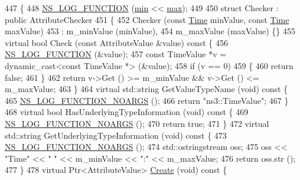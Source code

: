 \begin{DoxyCode}
447 \{
448   \hyperlink{log-macros-disabled_8h_a90b90d5bad1f39cb1b64923ea94c0761}{NS\_LOG\_FUNCTION} (\hyperlink{80211b_8c_ac6afabdc09a49a433ee19d8a9486056d}{min} << \hyperlink{80211b_8c_affe776513b24d84b39af8ab0930fef7f}{max});
449 
450   \textcolor{keyword}{struct }Checker : \textcolor{keyword}{public} AttributeChecker
451   \{
452     Checker (\textcolor{keyword}{const} \hyperlink{namespacens3_1_1TracedValueCallback_a7ffd3e7c142ffe7c8a1d2db9b8de38ec}{Time} minValue, \textcolor{keyword}{const} \hyperlink{namespacens3_1_1TracedValueCallback_a7ffd3e7c142ffe7c8a1d2db9b8de38ec}{Time} maxValue)
453       : m\_minValue (minValue),
454         m\_maxValue (maxValue) \{\}
455     \textcolor{keyword}{virtual} \textcolor{keywordtype}{bool} Check (\textcolor{keyword}{const} AttributeValue &value)\textcolor{keyword}{ const }\{
456       \hyperlink{log-macros-disabled_8h_a90b90d5bad1f39cb1b64923ea94c0761}{NS\_LOG\_FUNCTION} (&value);
457       \textcolor{keyword}{const} TimeValue *v = \textcolor{keyword}{dynamic\_cast<}\textcolor{keyword}{const }TimeValue *\textcolor{keyword}{>} (&value);
458       \textcolor{keywordflow}{if} (v == 0)
459         \{
460           \textcolor{keywordflow}{return} \textcolor{keyword}{false};
461         \}
462       \textcolor{keywordflow}{return} v->Get () >= m\_minValue && v->Get () <= m\_maxValue;
463     \}
464     \textcolor{keyword}{virtual} std::string GetValueTypeName (\textcolor{keywordtype}{void})\textcolor{keyword}{ const }\{
465       \hyperlink{log-macros-disabled_8h_a8f7e4afc291c9d29a65c18ac1f79197b}{NS\_LOG\_FUNCTION\_NOARGS} ();
466       \textcolor{keywordflow}{return} \textcolor{stringliteral}{"ns3::TimeValue"};
467     \}
468     \textcolor{keyword}{virtual} \textcolor{keywordtype}{bool} HasUnderlyingTypeInformation (\textcolor{keywordtype}{void})\textcolor{keyword}{ const }\{
469       \hyperlink{log-macros-disabled_8h_a8f7e4afc291c9d29a65c18ac1f79197b}{NS\_LOG\_FUNCTION\_NOARGS} ();
470       \textcolor{keywordflow}{return} \textcolor{keyword}{true};
471     \}
472     \textcolor{keyword}{virtual} std::string GetUnderlyingTypeInformation (\textcolor{keywordtype}{void})\textcolor{keyword}{ const }\{
473       \hyperlink{log-macros-disabled_8h_a8f7e4afc291c9d29a65c18ac1f79197b}{NS\_LOG\_FUNCTION\_NOARGS} ();
474       std::ostringstream oss;
475       oss << \textcolor{stringliteral}{"Time"} << \textcolor{stringliteral}{" "} << m\_minValue << \textcolor{stringliteral}{":"} << m\_maxValue;
476       \textcolor{keywordflow}{return} oss.str ();
477     \}
478     \textcolor{keyword}{virtual} Ptr<AttributeValue> \hyperlink{group__ptr_ga0406dd2d929ceac05ce39d4579fa3e4b}{Create} (\textcolor{keywordtype}{void})\textcolor{keyword}{ const }\{

\end{DoxyCode}
